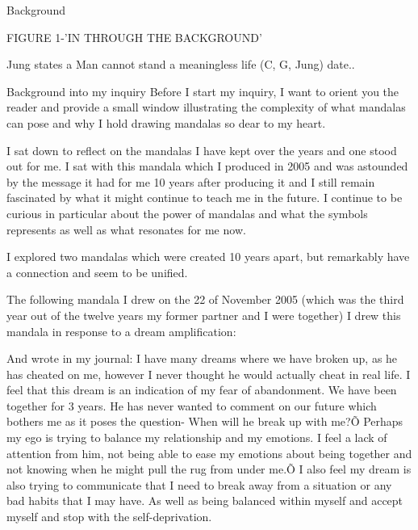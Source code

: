 Background 

FIGURE 1-'IN THROUGH THE BACKGROUND'

Jung states a Man cannot stand a meaningless life (C, G, Jung) date..



Background into my inquiry 
Before I start my inquiry, I want to orient you the reader and provide a small window illustrating the complexity of what mandalas can pose and why I hold drawing mandalas so dear to my heart. 

I sat down to reflect on the mandalas I have kept over the years and one stood out for me. I sat with this mandala which I produced in 2005 and was astounded by the message it had for me 10 years after producing it and I still remain fascinated by what it might continue to teach me in the future. I continue to be curious in particular about the power of mandalas and what the symbols represents as well as what resonates for me now. 

I explored two mandalas which were created 10 years apart, but remarkably have a connection and seem to be unified.   

The following mandala I drew on the 22 of November 2005 (which was the third year out of the twelve years my former partner and I were together) I drew this mandala in response to a dream amplification: 



And wrote in my journal:
I have many dreams where we have broken up, as he has cheated on me, however I never thought he would actually cheat in real life. I feel that this dream is an indication of my fear of abandonment. We have been together for 3 years. He has never wanted to comment on our future which bothers me as it poses the question- When will he break up with me?Õ Perhaps my ego is trying to balance my relationship and my emotions. I feel a lack of attention from him, not being able to ease my emotions about being together and not knowing when he might pull the rug from under me.Õ I also feel my dream is also trying to communicate that I need to break away from a situation or any bad habits that I may have. As well as being balanced within myself and accept myself and stop with the self-deprivation.  

